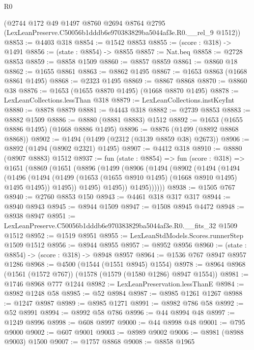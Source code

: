\begin{lexlean}{R0}
\begin{coremodule}
    (@2744
      @172
      @49
      @1497
      @8760
      @2694
      @8764
      @2795
      (LexLeanPreserve.C50056b1dddb6e970383829ba5044af3e.R0.__rel_9 @1512))
@8853 := @4403 @318
@8854 := @1542 @8853
@8855 := (score : @318) -> @1491
@8856 := (state : @8854) -> @8855
@8857 := Nat.beq
@8858 := @2728 @8853
@8859 := @8858 @1509
@8860 := @8857 @8859
@8861 := @8860 @18
@8862 := @1655 @8861
@8863 := @8862 @1495
@8867 := @1653 @8863 (@1668 @8861 @1495)
@8868 := @2323 @1495
@8869 := @8867 @8868
@8870 := @8860 @38
@8876 := @1653 (@1655 @8870 @1495) (@1668 @8870 @1495)
@8878 := LexLeanCollections.lessThan @318
@8879 := LexLeanCollections.instKeyInt
@8880 := @8878 @8879
@8881 := @4443 @318
@8882 := @2739 @8853
@8883 := @8882 @1509
@8886 := @8880 (@8881 @8883) @1512
@8892 := @1653 (@1655 @8886 @1495) (@1668 @8886 @1495)
@8896 := @8876 (@1499 (@8892 @8868 @8868))
@8902 := @1494 (@1499 (@2312 (@3139 @8859 @38) @2673))
@8906 := @8892 (@1494 (@8902 @2321) @1495)
@8907 := @4412 @318
@8910 := @8880 (@8907 @8883) @1512
@8937 := fun (state : @8854) =>
  fun (score : @318) =>
  @1651
    (@8869
      (@1651
        (@8896
          (@1499
            (@8906
              (@1494
                (@8902
                  (@1494
                    (@1494
                      (@1496
                        (@1494
                          (@1499 (@1653 (@1655 @8910 @1495) (@1668 @8910 @1495) @1495 @1495))
                          @1495))
                      @1495)
                    @1495))
                @1495))))))
@8938 := @1505 @767
@8940 := @2760 @8853 @150
@8943 := @4461 @318 @317 @317
@8944 := @8940 @8943
@8945 := @8944 @1509
@8947 := @1508 @8945 @4472
@8948 := @8938 @8947
@8951 := LexLeanPreserve.C50056b1dddb6e970383829ba5044af3e.R0.__fits_32 @1509 @1512
@8952 := @1519 @8951
@8955 := LexLeanStdModels.Scores.runnerStep @1509 @1512
@8956 := @8944 @8955
@8957 := @8952 @8956
@8960 := (state : @8854) -> (score : @318) -> @8948 @8957
@8964 := @1536 @767 @8947 @8957 @1286
@8968 := @4500 (@1544 (@1551 @8945) @1554)
@8978 := @8964 @8968 (@1561 (@1572 @767)) (@1578 (@1579 (@1580 @1286) @8947 @1554))
@8981 := @1746 @8968 @777 @1244
@8982 := LexLeanPreservation.lessThanE
@8984 := @8982 @1248 @58
@8985 := @52 @8984
@8987 := @8985 @1261 @1267
@8988 := @1247 @8987
@8989 := @8985 @1271
@8991 := @8982 @786 @58
@8992 := @52 @8991
@8994 := @8992 @58 @786
@8996 := @44 @8994 @48
@8997 := @1249 @8996
@8998 := @608 @8997
@9000 := @44 @8998 @48
@9001 := @795 @9000
@9002 := @607 @9001
@9003 := @8989 @9002
@9006 := @8981 (@8988 @9003) @1500
@9007 := @1757 @8868
@9008 := @8858 @1965

\end{coremodule}
\end{lexlean}
